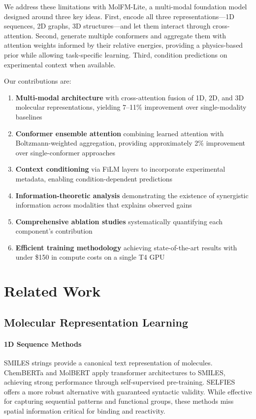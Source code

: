 \documentclass[11pt]{article}
\newcommand{\modelname}{MolFM-Lite}
\begin{document}
We address these limitations with \modelname{}, a multi-modal foundation model designed around three key ideas. First, encode all three representations---1D sequences, 2D graphs, 3D structures---and let them interact through cross-attention. Second, generate multiple conformers and aggregate them with attention weights informed by their relative energies, providing a physics-based prior while allowing task-specific learning. Third, condition predictions on experimental context when available.

Our contributions are:
\begin{enumerate}[leftmargin=*,itemsep=2pt]
    \item \textbf{Multi-modal architecture} with cross-attention fusion of 1D, 2D, and 3D molecular representations, yielding 7--11\% improvement over single-modality baselines
    \item \textbf{Conformer ensemble attention} combining learned attention with Boltzmann-weighted aggregation, providing approximately 2\% improvement over single-conformer approaches
    \item \textbf{Context conditioning} via FiLM layers to incorporate experimental metadata, enabling condition-dependent predictions
    \item \textbf{Information-theoretic analysis} demonstrating the existence of synergistic information across modalities that explains observed gains
    \item \textbf{Comprehensive ablation studies} systematically quantifying each component's contribution
    \item \textbf{Efficient training methodology} achieving state-of-the-art results with under \$150 in compute costs on a single T4 GPU
\end{enumerate}

\section{Related Work}
\label{sec:related}

\subsection{Molecular Representation Learning}

\paragraph{1D Sequence Methods}
SMILES strings \citep{weininger1988smiles} provide a canonical text representation of molecules. ChemBERTa \citep{chithrananda2020chemberta} and MolBERT \citep{fabian2020molecular} apply transformer architectures to SMILES, achieving strong performance through self-supervised pre-training. SELFIES \citep{krenn2020selfies} offers a more robust alternative with guaranteed syntactic validity. While effective for capturing sequential patterns and functional groups, these methods miss spatial information critical for binding and reactivity.
\end{document}
